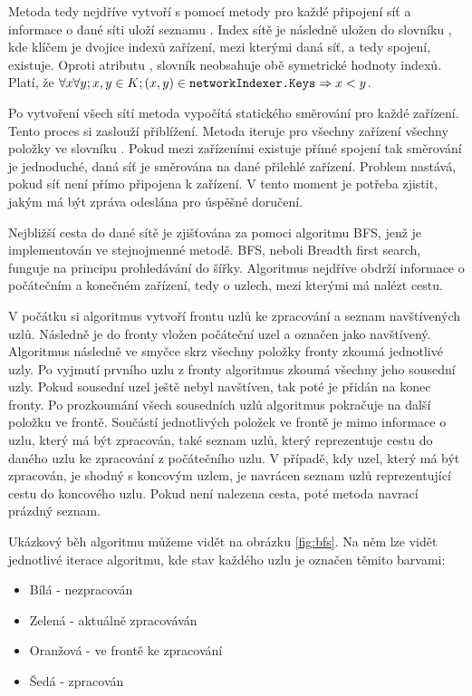 Metoda tedy nejdříve vytvoří s pomocí metody  pro každé připojení síť a informace o dané síti uloží seznamu . Index sítě je následně uložen do slovníku , kde klíčem je dvojice indexů zařízení, mezi kterými daná síť, a tedy spojení, existuje. Oproti atributu , slovník neobsahuje obě symetrické hodnoty indexů. Platí, že $\forall x \forall y; x,y\in K; (x,y) \in \texttt{networkIndexer.Keys} \Rightarrow x < y$. 

Po vytvoření všech sítí metoda vypočítá statického směrování pro každé zařízení. Tento proces si zaslouží přiblížení. Metoda iteruje pro všechny zařízení všechny položky ve slovníku . Pokud mezi zařízeními existuje přímé spojení tak směrování je jednoduché, daná síť je směrována na dané přilehlé zařízení. Problem nastává, pokud síť není přímo připojena k zařízení. V tento moment je potřeba zjistit, jakým  má být zpráva odeslána pro úspěšné doručení.

Nejbližší cesta do dané sítě je zjišťována za pomoci algoritmu BFS, jenž je implementován ve stejnojmenné metodě. BFS, neboli Breadth first search, funguje na principu prohledávání do šířky. Algoritmus nejdříve obdrží informace o počátečním a konečném zařízení, tedy o uzlech, mezi kterými má nalézt cestu. 

V počátku si algoritmus vytvoří frontu uzlů ke zpracování a seznam navštívených uzlů. Následně je do fronty vložen počáteční uzel a označen jako navštívený. Algoritmus následně ve smyčce skrz všechny položky fronty zkoumá jednotlivé uzly. Po vyjmutí prvního uzlu z fronty algoritmus zkoumá všechny jeho sousední uzly. Pokud sousední uzel ještě nebyl navštíven, tak poté je přidán na konec fronty. Po prozkoumání všech sousedních uzlů algoritmus pokračuje na další položku ve frontě. Součástí jednotlivých položek ve frontě je mimo informace o uzlu, který má být zpracován, také seznam uzlů, který reprezentuje cestu do daného uzlu ke zpracování z počátečního uzlu. V případě, kdy uzel, který má být zpracován, je shodný s koncovým uzlem, je navrácen seznam uzlů reprezentující cestu do koncového uzlu. Pokud není nalezena cesta, poté metoda navrací prázdný seznam. \cite{pruvodce_alogritmu}

Ukázkový běh algoritmu můžeme vidět na obrázku \ref{fig:bfs}. Na něm lze vidět jednotlivé iterace algoritmu, kde stav každého uzlu je označen těmito barvami:

\begin{itemize}
    \item Bílá - nezpracován
    \item Zelená - aktuálně zpracováván
    \item Oranžová - ve frontě ke zpracování
    \item Šedá - zpracován
\end{itemize}

